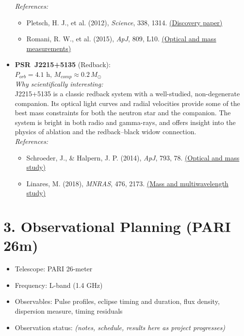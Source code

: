 \documentclass[12pt]{article}
\begin{document}
\begin{itemize}
    \textit{References:}
    \begin{itemize}
        \item Pletsch, H. J., et al. (2012), \textit{Science}, 338, 1314. \href{https://www.science.org/doi/10.1126/science.1229054}{(Discovery paper)}
        \item Romani, R. W., et al. (2015), \textit{ApJ}, 809, L10. \href{https://iopscience.iop.org/article/10.1088/2041-8205/809/1/L10}{(Optical and mass measurements)}
    \end{itemize}
    \vspace{0.5em}
    
    \item \textbf{PSR~J2215+5135} (Redback):\\ $P_{orb}=4.1$ h, $M_{comp}\approx0.2\,M_\odot$\\
    
    \textit{Why scientifically interesting:}\\
    J2215+5135 is a classic redback system with a well-studied, non-degenerate companion. Its optical light curves and radial velocities provide some of the best mass constraints for both the neutron star and the companion. The system is bright in both radio and gamma-rays, and offers insight into the physics of ablation and the redback--black widow connection.\\
    
    \textit{References:}
    \begin{itemize}
        \item Schroeder, J., \& Halpern, J. P. (2014), \textit{ApJ}, 793, 78. \href{https://iopscience.iop.org/article/10.1088/0004-637X/793/2/78}{(Optical and mass study)}
        \item Linares, M. (2018), \textit{MNRAS}, 476, 2173. \href{https://academic.oup.com/mnras/article/476/2/2173/4844415}{(Mass and multiwavelength study)}
    \end{itemize}
\end{itemize}


\section*{3. Observational Planning (PARI 26m)}
\begin{itemize}
    \item Telescope: PARI 26-meter
    \item Frequency: L-band (1.4 GHz)
    \item Observables: Pulse profiles, eclipse timing and duration, flux density, dispersion measure, timing residuals
    \item Observation status: \textit{(notes, schedule, results here as project progresses)}
\end{itemize}
\end{document}
